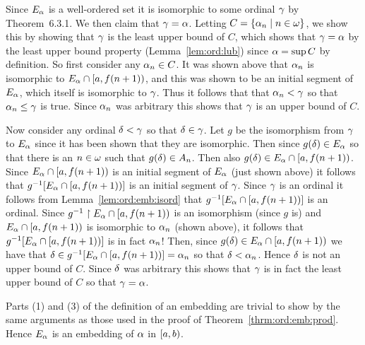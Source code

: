 {{    Since $E_\alpha$ is a well-ordered set it is isomorphic to some ordinal $\gamma$ by Theorem~6.3.1.
    We then claim that $\gamma = \alpha$.
    Letting $C = \left\{ \alpha_n \mid n \in \omega \right\}$, we show this by showing that $\gamma$ is the least upper bound of $C$, which shows that $\gamma = \alpha$ by the least upper bound property (Lemma~\ref{lem:ord:lub}) since $\alpha = \sup{C}$ by definition.
    So first consider any $\alpha_n \in C$.
    It was shown above that $\alpha_n$ is isomorphic to $E_\alpha \cap [a, f(n+1))$, and this was shown to be an initial segment of $E_\alpha$, which itself is isomorphic to $\gamma$.
    Thus it follows that that $\alpha_n < \gamma$ so that $\alpha_n \leq \gamma$ is true.
    Since $\alpha_n$ was arbitrary this shows that $\gamma$ is an upper bound of $C$.

    Now consider any ordinal $\delta < \gamma$ so that $\delta \in \gamma$.
    Let $g$ be the isomorphism from $\gamma$ to $E_\alpha$ since it has been shown that they are isomorphic.
    Then since $g(\delta) \in E_\alpha$ so that there is an $n \in \omega$ such that $g(\delta) \in A_n$.
    Then also $g(\delta) \in E_\alpha \cap [a, f(n+1))$.
    Since $E_\alpha \cap [a, f(n+1))$ is an initial segment of $E_\alpha$ (just shown above) it follows that $g^{-1}[E_\alpha \cap [a, f(n+1))]$ is an initial segment of $\gamma$.
    Since $\gamma$ is an ordinal it follows from Lemma~\ref{lem:ord:emb:isord} that $g^{-1}[E_\alpha \cap [a, f(n+1))]$ is an ordinal.
    Since $g^{-1} \restriction E_\alpha \cap [a, f(n+1))$ is an isomorphism (since $g$ is) and $E_\alpha \cap [a, f(n+1))$ is isomorphic to $\alpha_n$ (shown above), it follows that $g^{-1}[E_\alpha \cap [a, f(n+1))]$ is in fact $\alpha_n$!
    Then, since $g(\delta) \in E_\alpha \cap [a, f(n+1))$ we have that $\delta \in g^{-1}[E_\alpha \cap [a, f(n+1))] = \alpha_n$ so that $\delta < \alpha_n$.
    Hence $\delta$ is not an upper bound of $C$.
    Since $\delta$ was arbitrary this shows that $\gamma$ is in fact the least upper bound of $C$ so that $\gamma = \alpha$.

    Parts (1) and (3) of the definition of an embedding are trivial to show by the same arguments as those used in the proof of Theorem~\ref{thrm:ord:emb:prod}.
    Hence $E_\alpha$ is an embedding of $\alpha$ in $[a,b)$.
  }

  \mainprob

}
